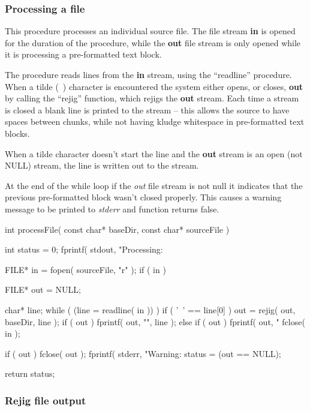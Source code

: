 \documentclass[]{article}
\begin{document}
\subsubsection{			Processing a file}

This procedure processes an individual source file.
The file stream \textbf{in} is opened for the duration of the procedure, while the \textbf{out} file stream is only opened while it is processing a pre-formatted text block.


The procedure reads lines from the \textbf{in} stream, using the ``readline'' procedure.
When a tilde (~) character is encountered the system either opens, or closes, \textbf{out} by calling the ``rejig'' function, which rejigs the \textbf{out} stream.
Each time a stream is closed a blank line is printed to the stream -- this allows the source to have spaces between chunks, while not having kludge whitespace in pre-formatted text blocks.


When a tilde character doesn't start the line and the \textbf{out} stream is an open (not NULL) stream, the line is written out to the stream.


At the end of the while loop if the \emph{out} file stream is not null it indicates that the previous pre-formatted block wasn't closed properly.
This causes a warning message to be printed to \emph{stderr} and function returns false.

\begin{verbatimtab}
int processFile( const char* baseDir, const char* sourceFile )
{
	int status = 0;
	fprintf( stdout, "Processing: %

	FILE* in = fopen( sourceFile, "r" );
	if ( in )
	{
		FILE* out = NULL;

		char* line;
		while ( (line = readline( in )) )
		{
			if ( '~' == line[0] ) {
				out = rejig( out, baseDir, line );
				if ( out ) fprintf( out, "\n", line );
			}
			else if ( out )
			{
				fprintf( out, "%
			}
		}
		fclose( in );

		if ( out )
		{
			fclose( out );
			fprintf( stderr, "Warning: %
		}
		status = (out == NULL);
	}

	return status;
}

\end{verbatimtab}
\subsubsection{			Rejig file output}
\end{document}
